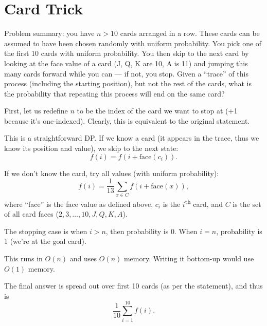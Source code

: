 \section{Card Trick}

Problem summary: you have $n > 10$ cards arranged in a row. These cards can be
assumed to have been chosen randomly with uniform probability. You pick one of
the first 10 cards with uniform probability. You then skip to the next card by
looking at the face value of a card (J, Q, K are 10, A is 11) and jumping this
many cards forward while you can --- if not, you stop. Given a ``trace'' of this
process (including the starting position), but not the rest of the cards, what
is the probability that repeating this process will end on the same card?

First, let us redefine $n$ to be the index of the card we want to stop at (+1
because it's one-indexed). Clearly, this is equivalent to the original
statement.

This is a straightforward DP. If we know a card (it appears in the trace, thus
we know its position and value), we skip to the next state: $$f(i) =
f(i+\textrm{face}(c_i)).$$

If we don't know the card, try all values (with uniform probability): $$f(i) =
\frac{1}{13} \sum_{x \in C} f(i + \textrm{face}(x)),$$ where ``face'' is the
face value as defined above, $c_i$ is the $i$\textsuperscript{th} card, and $C$
is the set of all card faces ($2, 3, \dots, 10, J, Q, K, A$).

The stopping case is when $i > n$, then probability is 0. When $i = n$,
probability is 1 (we're at the goal card).

This runs in $O(n)$ and uses $O(n)$ memory. Writing it bottom-up would use
$O(1)$ memory.

The final answer is spread out over first 10 cards (as per the statement), and
thus is $$\frac{1}{10}\sum_{i=1}^{10} f(i).$$
